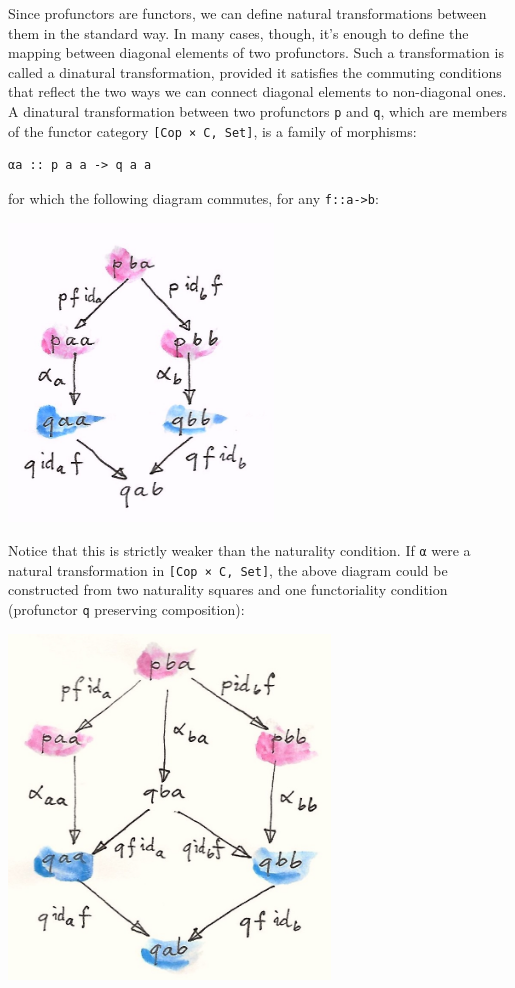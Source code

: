 Since profunctors are functors, we can define natural transformations
between them in the standard way. In many cases, though, it's enough to
define the mapping between diagonal elements of two profunctors. Such a
transformation is called a dinatural transformation, provided it
satisfies the commuting conditions that reflect the two ways we can
connect diagonal elements to non-diagonal ones. A dinatural
transformation between two profunctors \texttt{p} and \texttt{q}, which
are members of the functor category \texttt{{[}Cop\ ×\ C,\ Set{]}}, is a
family of morphisms:

\begin{verbatim}
αa :: p a a -> q a a
\end{verbatim}

for which the following diagram commutes, for any
\texttt{f::a-\textgreater{}b}:

\includegraphics[width=2.77083in]{images/end.jpg}

Notice that this is strictly weaker than the naturality condition. If
\texttt{α} were a natural transformation in
\texttt{{[}Cop\ ×\ C,\ Set{]}}, the above diagram could be constructed
from two naturality squares and one functoriality condition (profunctor
\texttt{q} preserving composition):

\includegraphics[width=3.36458in]{images/end-1.jpg}

